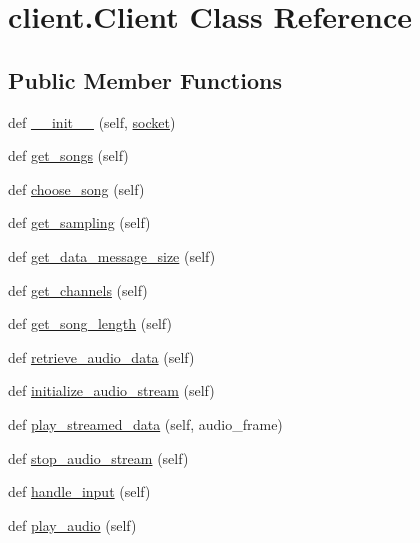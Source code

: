 \hypertarget{classclient_1_1_client}{}\section{client.\+Client Class Reference}
\label{classclient_1_1_client}
\subsection*{Public Member Functions}
\begin{DoxyCompactItemize}
\item 
def \mbox{\hyperlink{classclient_1_1_client_a69d3065fc7ea0880083203666659cd3d}{\+\_\+\+\_\+init\+\_\+\+\_\+}} (self, \mbox{\hyperlink{classclient_1_1_client_a2c7ab020d8f44b7a1dc077933e479cfc}{socket}})
\item 
def \mbox{\hyperlink{classclient_1_1_client_a3750b6fec748f30f7f743fd1ce6959ec}{get\+\_\+songs}} (self)
\item 
def \mbox{\hyperlink{classclient_1_1_client_a3cd7973d42ff3ffa6fe61a078cd4ebdd}{choose\+\_\+song}} (self)
\item 
def \mbox{\hyperlink{classclient_1_1_client_a1ea688c381f714976f489873002bac8c}{get\+\_\+sampling}} (self)
\item 
def \mbox{\hyperlink{classclient_1_1_client_aa20f7f8ab952191d709158a5bc5e33cb}{get\+\_\+data\+\_\+message\+\_\+size}} (self)
\item 
def \mbox{\hyperlink{classclient_1_1_client_a1be4e39c0bb457fbdd4b01001c1fd2e0}{get\+\_\+channels}} (self)
\item 
def \mbox{\hyperlink{classclient_1_1_client_a41a5b2936e0d2d529bbe83b3ee3c2a5f}{get\+\_\+song\+\_\+length}} (self)
\item 
def \mbox{\hyperlink{classclient_1_1_client_aa136a25c0d00452c3ec1d229285f2e34}{retrieve\+\_\+audio\+\_\+data}} (self)
\item 
def \mbox{\hyperlink{classclient_1_1_client_a3b9a4e393333a884eae6783f272e6d64}{initialize\+\_\+audio\+\_\+stream}} (self)
\item 
def \mbox{\hyperlink{classclient_1_1_client_abbcdbabd70d9d67a2378f3412ae8f5db}{play\+\_\+streamed\+\_\+data}} (self, audio\+\_\+frame)
\item 
def \mbox{\hyperlink{classclient_1_1_client_a1ad22cceab7abf799d72603c012e4bcd}{stop\+\_\+audio\+\_\+stream}} (self)
\item 
def \mbox{\hyperlink{classclient_1_1_client_af2db73fbc5f326a580fd7996af13c698}{handle\+\_\+input}} (self)
\item 
def \mbox{\hyperlink{classclient_1_1_client_ad422023bb1c71a266d1065cf270902e4}{play\+\_\+audio}} (self)
\end{DoxyCompactItemize}
